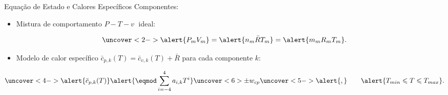     \begin{frame}{Equação de Estado e Calores Específicos Componentes:}\vspace*{-2em}
        \begin{itemize}
            \item<1-> Mistura de comportamento \alert{$P-T-v\;$ ideal}:
        \end{itemize}
        \vspace*{0.8em}\begin{equation*}
            \uncover<2->{
                \alert{P_mV_m} =
                    \alert{n_m\bar{R}T_m} =
                    \alert{m_mR_mT_m}.
            }
        \end{equation*}
        \vspace*{-0.8em}\begin{itemize}
            \item<3-> Modelo de calor específico \alert{$\bar{c}_{p,k}(T) = \bar{c}_{v,k}(T) +
                \bar{R}$} para cada componente \alert{$k$}:
        \end{itemize}
        \vspace*{0.8em}\begin{equation*}
            \uncover<4->{
                \alert{\bar{c}_{p,k}(T)}
                    \alert{\eqmod \sum_{i=-4}^4 a_{i,k}T^i}
                    \uncover<6>{\pm w_{cp}}
                    \uncover<5->{\alert{,}\qquad\alert{T_{min} \leqslant T \leqslant T_{max}}.}
            }
        \end{equation*}
    \end{frame}

